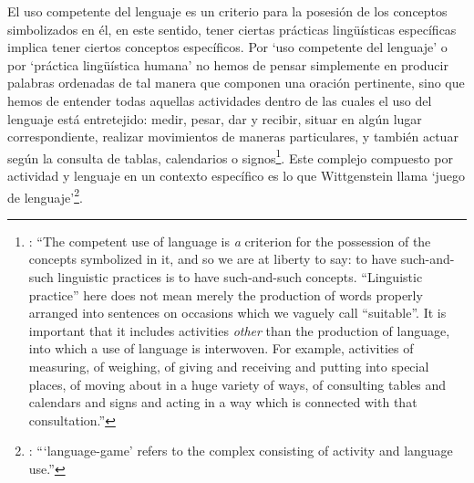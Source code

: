 El uso competente del lenguaje es un criterio para la posesión de los conceptos simbolizados en él, en este sentido, tener ciertas prácticas lingüísticas específicas implica tener ciertos conceptos específicos. Por `uso competente del lenguaje' o por `práctica lingüística humana' no hemos de pensar simplemente en producir palabras ordenadas de tal manera que componen una oración pertinente, sino que hemos de entender todas aquellas actividades dentro de las cuales el uso del lenguaje está entretejido: medir, pesar, dar y recibir, situar en algún lugar correspondiente, realizar movimientos de maneras particulares, y también actuar según la consulta de tablas, calendarios o signos\footnote{\cite[Cf.~][117]{anscombe1981parmenides:qli}: \enquote{The competent use of language is \emph{a} criterion for the possession of the concepts symbolized in it, and so we are at liberty to say: to have such-and-such linguistic practices is to have such-and-such concepts. ``Linguistic practice'' here does not mean merely the production of words properly arranged into sentences on occasions which we vaguely call ``suitable''. It is important that it includes activities \emph{other} than the production of language, into which a use of language is interwoven. For example, activities of measuring, of weighing, of giving and receiving and putting into special places, of moving about in a huge variety of ways, of consulting tables and calendars and signs and acting in a way which is connected with that consultation.}}. Este complejo compuesto por actividad y lenguaje en un contexto específico es lo que Wittgenstein llama `juego de lenguaje'\footnote{\cite[Cf.~][62]{bakerhacker2009understanding}: \enquote{`language-game' refers to the complex consisting of activity and language use.}}.

